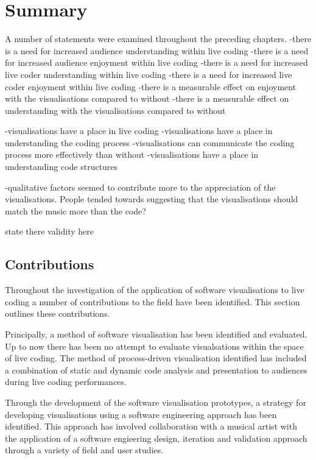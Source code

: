 
\chapter{Summary}
\label{chap:summary}

A number of statements were examined throughout the preceding chapters.
-there is a need for increased audience understanding within live coding
-there is a need for increased audience enjoyment within live coding
-there is a need for increased live coder understanding within live coding
-there is a need for increased live coder enjoyment within live coding
-there is a measurable effect on enjoyment with the visualisations compared to without
-there is a measurable effect on understanding with the visualisations compared to without

-visualisations have a place in live coding
-visualisations have a place in understanding the coding process
-visualisations can communicate the coding process more effectively than without
-visualisations have a place in understanding code structures

-qualitative factors seemed to contribute more to the appreciation of the visualisations. People tended towards suggesting that the visualisations should match the music more than the code?

{\color{red} state there validity here}

\section{Contributions}

Throughout the investigation of the application of software visualisations to live coding a number of contributions to the field have been identified. This section outlines these contributions.

Principally, a method of software visualisation has been identified and evaluated. Up to now there has been no attempt to evaluate visualsations within the space of live coding. The method of process-driven visualisation identified has included a combination of static and dynamic code analysis and presentation to audiences during live coding performances.

Through the development of the software visualisation prototypes, a strategy for developing visualisations using a software engineering approach has been identified. This approach has involved collaboration with a musical artist with the application of a software engieering design, iteration and validation approach through a variety of field and user studies.

